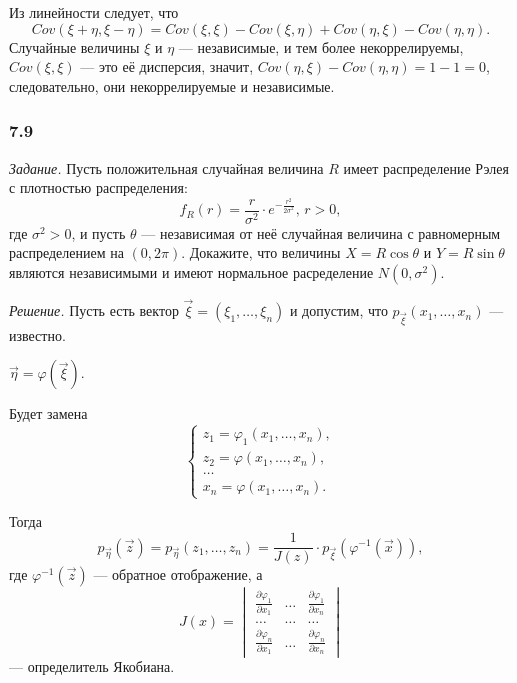 Из линейности следует,
что
$$Cov \left( \xi + \eta, \xi - \eta \right) =
  Cov \left( \xi, \xi \right) - Cov \left( \xi, \eta \right) +
  Cov \left( \eta, \xi \right) - Cov \left( \eta, \eta \right).$$
Случайные величины $ \xi $ и $ \eta $ --- независимые, и тем более некоррелируемы,
$Cov \left( \xi, \xi \right) $ --- это её дисперсия, значит,
$Cov \left( \eta, \xi \right) - Cov \left( \eta, \eta \right) = 1 - 1 = 0$, следовательно,
они некоррелируемые и независимые.

\subsubsection*{7.9}

\textit{Задание.}
Пусть положительная случайная величина $R$ имеет распределение Рэлея с плотностью распределения:
$$f_R \left( r \right) =
  \frac{r}{ \sigma^2} \cdot e^{- \frac{r^2}{2 \sigma^2}}, \,
  r > 0,$$
где $ \sigma^2 > 0$, и пусть $ \theta $ ---
независимая от неё случайная величина с равномерным распределением на $ \left( 0, 2 \pi \right) $.
Докажите,
что величины $X = R \cos \theta $ и $Y = R \sin \theta $
являются независимыми и имеют нормальное расределение $N \left( 0, \sigma^2 \right) $.

\textit{Решение.}
Пусть есть вектор $ \vec{ \xi } = \left( \xi_1, \dotsc, \xi_n \right) $ и допустим,
что $p_{ \vec{ \xi }} \left( x_1, \dotsc, x_n \right) $ --- известно.

$ \vec{ \eta } =
  \varphi \left( \vec{ \xi } \right) $.

Будет замена
$$ \begin{cases}
    z_1 = \varphi_1 \left( x_1, \dotsc, x_n \right), \\
    z_2 = \varphi \left( x_1, \dotsc, x_n \right), \\
    \dotsc \\
    x_n = \varphi \left( x_1, \dotsc, x_n \right).
  \end{cases}$$

Тогда
$$p_{ \vec{ \eta }} \left( \vec{z} \right) =
  p_{ \vec{ \eta }} \left( z_1, \dotsc, z_n \right) =
  \frac{1}{J \left( z \right) } \cdot
  p_{ \vec{ \xi }} \left( \varphi^{-1} \left( \vec{x} \right) \right),$$
где $ \varphi^{-1} \left( \vec{z} \right) $ --- обратное отображение, а
$$J \left( x \right) =
  \begin{vmatrix}
    \frac{ \partial \varphi_1}{ \partial x_1} & \dotsc & \frac{ \partial \varphi_1}{ \partial x_n} \\
    \dotsc & \dotsc & \dotsc \\
    \frac{ \partial \varphi_n}{ \partial x_1} & \dotsc & \frac{ \partial \varphi_n}{ \partial x_n}
  \end{vmatrix}$$
--- определитель Якобиана.

